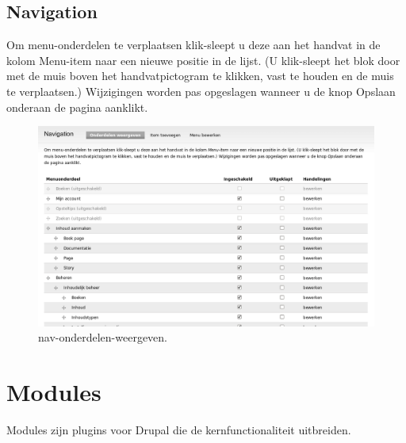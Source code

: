 \subsection{Navigation}
Om menu-onderdelen te verplaatsen klik-sleept u deze aan het handvat in de kolom
Menu-item naar een nieuwe positie in de lijst. (U klik-sleept het blok door met de muis boven het handvatpictogram te klikken, 
vast te houden en de muis te verplaatsen.) Wijzigingen worden pas opgeslagen wanneer u de knop Opslaan onderaan de pagina aanklikt.
\begin{figure}[!h]
    \centering
   \includegraphics[scale=0.3,angle=0]{nav-onderdelen-weergeven}
   \caption{nav-onderdelen-weergeven.\label{white}}
 \end{figure}



\section{Modules} 
Modules zijn plugins  voor Drupal die de kernfunctionaliteit
uitbreiden.

